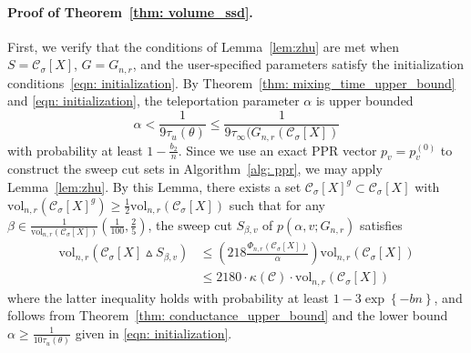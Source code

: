 \documentclass[11pt,twoside]{article}
\newcommand{\set}[1]{\left\{#1\right\}}
\newcommand{\vol}{\mathrm{vol}}
\newcommand{\1}{\mathbbm{1}}
\newcommand{\taubf}{\tau_{u}}
\newcommand{\Xbf}{X}
\newcommand{\Cset}{\mathcal{C}}
\newcommand{\Csig}{\Cset_{\sigma}}
\begin{document}
\paragraph{Proof of Theorem~\ref{thm: volume_ssd}.}
First, we verify that the conditions of Lemma~\ref{lem:zhu} are met when $S = \Cset_{\sigma}[\Xbf]$, $G = G_{n,r}$, and the user-specified parameters satisfy the initialization conditions~\eqref{eqn: initialization}. By Theorem~\ref{thm: mixing_time_upper_bound} and \eqref{eqn: initialization}, the teleportation parameter $\alpha$ is upper bounded
\begin{equation*}
\alpha < \frac{1}{9\taubf(\theta)} \leq \frac{1}{9\tau_\infty(G_{n,r}(\Cset_{\sigma}[\Xbf])}
\end{equation*}
with probability at least $1 - \frac{b_2}{n}$. Since we use an exact PPR vector $p_v = p_v^{(0)}$ to construct the sweep cut sets in Algorithm~\ref{alg: ppr}, we may apply Lemma~\ref{lem:zhu}. By this Lemma, there exists a set $\Csig[\Xbf]^g \subset \Csig[\Xbf]$ with $\vol_{n,r}(\Csig[\Xbf]^g) \geq \frac{1}{2}\vol_{n,r}(\Csig[\Xbf])$ such that for any $\beta \in \frac{1}{\vol_{n,r}(\Csig[\Xbf])}(\frac{1}{100},\frac{2}{5})$, the sweep cut $S_{\beta,v}$ of $p(\alpha, v; G_{n,r})$ satisfies
\begin{align}
\vol_{n,r}(\Csig[\Xbf] \vartriangle S_{\beta,v}) & \leq \left(218\frac{\Phi_{n,r}(\Csig[\Xbf])}{\alpha}\right) \vol_{n,r}(\Csig[\Xbf]) \nonumber \\
& \leq 2180 \cdot\kappa(\Cset)\cdot\vol_{n,r}(\Csig[\Xbf]) \label{eqn:volume_ssd_pf1}
\end{align}
where the latter inequality holds with probability at least $1 - 3\exp\set{-bn}$, and follows from Theorem~\ref{thm: conductance_upper_bound} and the lower bound $\alpha \geq \frac{1}{10 \tau_u(\theta)}$ given in \eqref{eqn: initialization}. 
\end{document}

